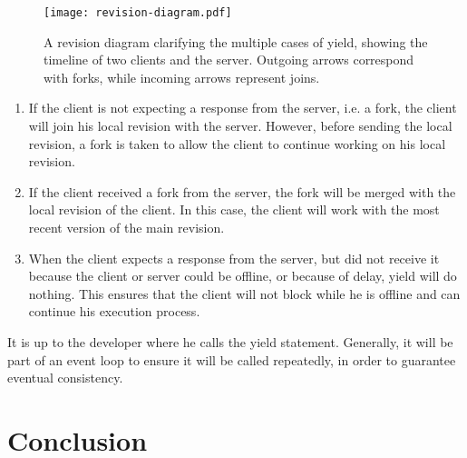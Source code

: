 \documentclass[a4paper,12pt]{report}
\begin{document}
\begin{figure}
    \vspace{-2,9cm}
    \small
    \centering
    \texttt{[image: revision-diagram.pdf]}
    \caption{A revision diagram clarifying the multiple cases of yield, showing the timeline of two clients and the server. Outgoing arrows correspond with forks, while incoming arrows represent joins.}
    \label{fig:revisiondiagram}
\end{figure}

\begin{enumerate}
    \item If the client is not expecting a response from the server, i.e. a fork, the client will join his local revision with the server. However, before sending the local revision, a fork is taken to allow the client to continue working on his local revision.
    \item If the client received a fork from the server, the fork will be merged with the local revision of the client. In this case, the client will work with the most recent version of the main revision.
    \item When the client expects a response from the server, but did not receive it because the client or server could be offline, or because of delay, yield will do nothing. This ensures that the client will not block while he is offline and can continue his execution process.
\end{enumerate}

It is up to the developer where he calls the yield statement. Generally, it will be part of an event loop to ensure it will be called repeatedly, in order to guarantee eventual consistency.

\chapter{Conclusion}\label{cha:Conclusion} %
\end{document}
